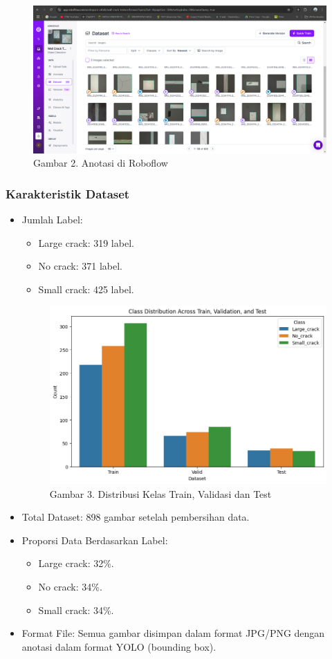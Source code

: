 \documentclass[12pt,a4paper]{article}
\begin{document}
\begin{figure}[h]
    \centering
    \includegraphics[width=0.8\linewidth]{Images/labeling.png}
    \caption*{Gambar 2. Anotasi di Roboflow}
    \label{fig:enter-label}
\end{figure}

\subsubsection{Karakteristik Dataset}
\begin{itemize}
    \item Jumlah Label:
    \begin{itemize}
        \item Large crack: 319 label.
        \item No crack: 371 label.
        \item Small crack: 425 label.
    \end{itemize}
    \begin{figure}[h]
        \centering
        \includegraphics[width=0.9\linewidth]{Images/jumlahlabel.png}
        \caption*{Gambar 3. Distribusi Kelas Train, Validasi dan Test}
        \label{fig:enter-label}
    \end{figure}
    \item Total Dataset: 898 gambar setelah pembersihan data.
    \item Proporsi Data Berdasarkan Label:
    \begin{itemize}
        \item Large crack: 32\%.
        \item No crack: 34\%.
        \item Small crack: 34\%.
    \end{itemize}
    \item Format File: Semua gambar disimpan dalam format JPG/PNG dengan anotasi dalam format YOLO (bounding box).
\end{itemize}
\end{document}

